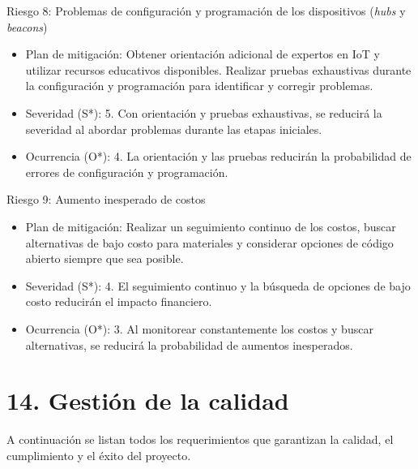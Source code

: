 \documentclass[
11pt, %
]{charter}
\begin{document}
Riesgo 8: Problemas de configuración y programación de los dispositivos (\textit{hubs} y \textit{beacons})
\begin{itemize}
	\item Plan de mitigación: Obtener orientación adicional de expertos en IoT y utilizar recursos educativos disponibles. Realizar pruebas exhaustivas durante la configuración y programación para identificar y corregir problemas.
	\item Severidad (S*): 5. Con orientación y pruebas exhaustivas, se reducirá la severidad al abordar problemas durante las etapas iniciales.
	\item Ocurrencia (O*): 4. La orientación y las pruebas reducirán la probabilidad de errores de configuración y programación.
\end{itemize}

Riesgo 9: Aumento inesperado de costos
\begin{itemize}
	\item Plan de mitigación: Realizar un seguimiento continuo de los costos, buscar alternativas de bajo costo para materiales y considerar opciones de código abierto siempre que sea posible.
	\item Severidad (S*): 4. El seguimiento continuo y la búsqueda de opciones de bajo costo reducirán el impacto financiero.
	\item Ocurrencia (O*): 3. Al monitorear constantemente los costos y buscar alternativas, se reducirá la probabilidad de aumentos inesperados.
\end{itemize}


\section{14. Gestión de la calidad}
\label{sec:calidad}

A continuación se listan todos los requerimientos que garantizan la calidad, el cumplimiento y el éxito del proyecto.
\end{document}
